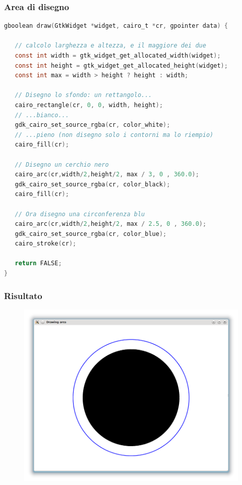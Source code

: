 \documentclass{beamer}
\begin{document}
\begin{frame}[fragile]
\frametitle{Area di disegno}
\begin{lstlisting}[language=C]
gboolean draw(GtkWidget *widget, cairo_t *cr, gpointer data) {

   // calcolo larghezza e altezza, e il maggiore dei due
   const int width = gtk_widget_get_allocated_width(widget);
   const int height = gtk_widget_get_allocated_height(widget);
   const int max = width > height ? height : width;
   
   // Disegno lo sfondo: un rettangolo...
   cairo_rectangle(cr, 0, 0, width, height);
   // ...bianco...
   gdk_cairo_set_source_rgba(cr, color_white);
   // ...pieno (non disegno solo i contorni ma lo riempio)
   cairo_fill(cr);

   // Disegno un cerchio nero
   cairo_arc(cr,width/2,height/2, max / 3, 0 , 360.0);
   gdk_cairo_set_source_rgba(cr, color_black);
   cairo_fill(cr);

   // Ora disegno una circonferenza blu
   cairo_arc(cr,width/2,height/2, max / 2.5, 0 , 360.0);
   gdk_cairo_set_source_rgba(cr, color_blue);
   cairo_stroke(cr);

   return FALSE;
}

\end{lstlisting}
\end{frame}

\begin{frame}
\frametitle{Risultato}
\begin{figure}
 \includegraphics[width=0.99\columnwidth]{img/5}
\end{figure}
\end{frame}
\end{document}
